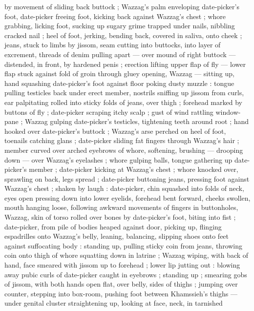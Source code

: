 by movement of sliding back buttock ; Wazzag's palm enveloping date-picker's foot, date-picker
freeing foot, kicking back against Wazzag's chest ; whore grabbing, licking foot, sucking up sugary
grime trapped under nails, nibbling cracked nail ; heel of foot, jerking, bending back, covered in
saliva, onto cheek ; jeans, stuck to limbs by jissom, seam cutting into buttocks, into layer of
excrement, threads of denim pulling apart --- over mound of right buttock --- distended, in front,
by hardened penis ; erection lifting upper flap of fly --- lower flap stuck against fold of groin
{\dashsemi} through gluey opening, Wazzag --- sitting up, hand squashing date-picker's foot against
floor {\dashcom} poking dusty muzzle : tongue pulling testicles back under erect member, nostrils
sniffing up jissom from curls, ear palpitating rolled into sticky folds of jeans, over thigh ;
forehead marked by buttons of fly ; date-picker scraping itchy scalp ; gust of wind rattling
window-pane ; Wazzag gulping date-picker's testicles, tightening teeth around root ; hand hooked
over date-picker's buttock ; Wazzag's arse perched on heel of foot, toenails catching glans ;
date-picker sliding fat fingers through Wazzag's hair ; member curved over arched eyebrows of whore,
softening, brushing --- drooping down --- over Wazzag's eyelashes ; whore gulping balls, tongue
gathering up date-picker's member ; date-picker kicking at Wazzag's chest ; whore knocked over,
sprawling on back, legs spread ; date-picker buttoning jeans, pressing foot against Wazzag's chest ;
shaken by laugh : date-picker, chin squashed into folds of neck, eyes open pressing down into lower
eyelids, forehead bent forward, cheeks swollen, mouth hanging 
loose, following awkward movements of fingers in buttonholes, Wazzag, skin of torso rolled over
bones by date-picker's foot, biting into fist ; date-picker, from pile of bodies heaped against
door, picking up, flinging espadrilles onto Wazzag's belly, leaning, balancing, slipping shoes onto
feet against suffocating body : standing up, pulling sticky coin from jeans, throwing coin onto
thigh of whore {\dashsemi} squatting down in latrine ; Wazzag wiping, with back of hand, face
smeared with jissom up to forehead ; lower lip jutting out : blowing away pubic curls of date-picker
caught in eyebrows ; standing up ; smearing gobs of jissom, with both hands open flat, over belly,
sides of thighs ; jumping over counter, stepping into box-room, pushing foot between Khamssieh's
thighs --- under genital cluster {\dashcom} straightening up, looking at face, neck, in tarnished
